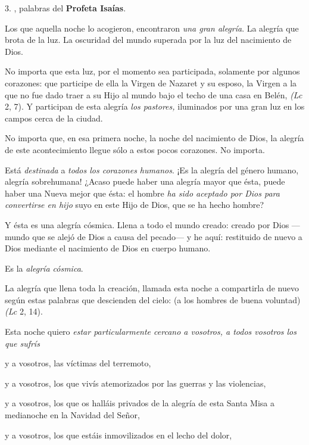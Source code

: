 \begin{body}
	3. , palabras del \textbf{Profeta Isaías}.
	
	Los que aquella noche lo acogieron, encontraron \emph{una gran alegría}. La alegría que brota de la luz. La oscuridad del mundo superada por la luz del nacimiento de Dios.
	
	No importa que esta luz, por el momento sea participada, solamente por algunos corazones: que participe de ella la Virgen de Nazaret y su esposo, la Virgen a la que no fue dado traer a su Hijo al mundo bajo el techo de una casa en Belén, \emph{(Lc} 2, 7). Y participan de esta alegría \emph{los pastores,} iluminados por una gran luz en los campos cerca de la ciudad.
	
	No importa que, en esa primera noche, la noche del nacimiento de Dios, la alegría de este acontecimiento llegue sólo a estos pocos corazones. No importa.
	
	Está \emph{destinada} a \emph{todos los corazones humanos}. ¡Es la alegría del género humano, alegría sobrehumana! ¿Acaso puede haber una alegría mayor que ésta, puede haber una Nueva mejor que ésta: el hombre \emph{ha sido aceptado por Dios para convertirse en hijo} suyo en este Hijo de Dios, que se ha hecho hombre?
	
	Y ésta es una alegría cósmica. Llena a todo el mundo creado: creado por Dios ---mundo que se alejó de Dios a causa del pecado--- y he aquí: restituido de nuevo a Dios mediante el nacimiento de Dios en cuerpo humano.
	
	Es la \emph{alegría cósmica}.
	
	La alegría que llena toda la creación, llamada esta noche a compartirla de nuevo según estas palabras que descienden del cielo:  (a los hombres de buena voluntad) \emph{(Lc} 2, 14).
	
	Esta noche quiero \emph{estar particularmente cercano a vosotros, a todos vosotros los que sufrís}
	
	y a vosotros, las víctimas del terremoto,
	
	y a vosotros, los que vivís atemorizados por las guerras y las violencias,
	
	y a vosotros, los que os halláis privados de la alegría de esta Santa Misa a medianoche en la Navidad del Señor,
	
	y a vosotros, los que estáis inmovilizados en el lecho del dolor,
	

\end{body}

